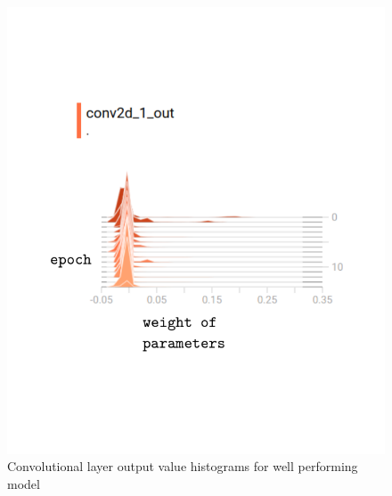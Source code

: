 \documentclass{article}
\begin{document}
\begin{figure}[h]
  \includegraphics[scale=0.8]{goodearlyout.pdf}
  \caption{Convolutional layer output value histograms for well performing model}
  \label{fig:goodearlyout}
\end{figure}
\end{document}
